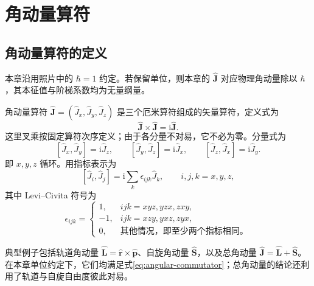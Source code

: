 \section{角动量算符}
\subsection{角动量算符的定义}
本章沿用照片中的 $\hbar=1$ 约定。若保留单位，则本章的 $\hat{\bm J}$ 对应物理角动量除以 $\hbar$，其本征值与阶梯系数均为无量纲量。

角动量算符 $\hat{\bm J}=\left(\hat J_x,\hat J_y,\hat J_z\right)$ 是三个厄米算符组成的矢量算符，定义式为
\begin{equation}
\boxed{\hat{\bm J}\times\hat{\bm J}=\mathrm{i}\hat{\bm J}.}
\end{equation}
这里叉乘按固定算符次序定义；由于各分量不对易，它不必为零。分量式为
\begin{equation}
\left[\hat J_x,\hat J_y\right]=\mathrm{i}\hat J_z,\qquad
\left[\hat J_y,\hat J_z\right]=\mathrm{i}\hat J_x,\qquad
\left[\hat J_z,\hat J_x\right]=\mathrm{i}\hat J_y.
\end{equation}
即 $x,y,z$ 循环。用指标表示为
\begin{equation}
\boxed{\left[\hat J_i,\hat J_j\right]=\mathrm{i}\sum_k\epsilon_{ijk}\hat J_k,}
\qquad i,j,k=x,y,z,
\label{eq:angular-commutator}
\end{equation}
其中 Levi--Civita 符号为
\begin{equation}
\epsilon_{ijk}=\begin{cases}
1,&ijk=xyz,yzx,zxy,\\
-1,&ijk=xzy,yxz,zyx,\\
0,&\text{其他情况，即至少两个指标相同。}
\end{cases}
\end{equation}

\begin{example}[单粒子系统中的角动量]
典型例子包括轨道角动量 $\hat{\bm L}=\hat{\bm r}\times\hat{\bm p}$、自旋角动量 $\hat{\bm S}$，以及总角动量 $\hat{\bm J}=\hat{\bm L}+\hat{\bm S}$。在本章单位约定下，它们均满足式\eqref{eq:angular-commutator}；总角动量的结论还利用了轨道与自旋自由度彼此对易。
\end{example}

